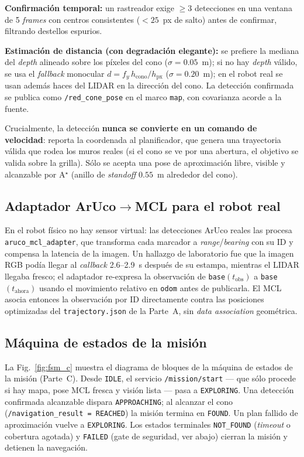 \textbf{Confirmación temporal:} un rastreador exige $\geq 3$ detecciones en una ventana de 5 \emph{frames} con centros consistentes ($<25$~px de salto) antes de confirmar, filtrando destellos espurios.

\textbf{Estimación de distancia (con degradación elegante):} se prefiere la mediana del \emph{depth} alineado sobre los píxeles del cono ($\sigma=0.05$~m); si no hay \emph{depth} válido, se usa el \emph{fallback} monocular $d = f_y\,h_{\text{cono}}/h_{\text{px}}$ ($\sigma=0.20$~m); en el robot real se usan además haces del LIDAR en la dirección del cono. La detección confirmada se publica como \texttt{/red\_cone\_pose} en el marco \texttt{map}, con covarianza acorde a la fuente.

Crucialmente, la detección \textbf{nunca se convierte en un comando de velocidad}: reporta la coordenada al planificador, que genera una trayectoria válida que rodea los muros reales (si el cono se ve por una abertura, el objetivo se valida sobre la grilla). Sólo se acepta una pose de aproximación libre, visible y alcanzable por A$^\star$ (anillo de \emph{standoff} $0.55$~m alrededor del cono).

\subsection{Adaptador ArUco$\rightarrow$MCL para el robot real}
En el robot físico no hay sensor virtual: las detecciones ArUco reales las procesa \texttt{aruco\_mcl\_adapter}, que transforma cada marcador a \emph{range}/\emph{bearing} con su ID y compensa la latencia de la imagen. Un hallazgo de laboratorio fue que la imagen RGB podía llegar al \emph{callback} 2.6--2.9~s después de su estampa, mientras el LIDAR llegaba fresco; el adaptador re-expresa la observación de \texttt{base}$(t_{\text{obs}})$ a \texttt{base}$(t_{\text{ahora}})$ usando el movimiento relativo en \texttt{odom} antes de publicarla. El MCL asocia entonces la observación por ID directamente contra las posiciones optimizadas del \texttt{trajectory.json} de la Parte~A, sin \emph{data association} geométrica.

\subsection{Máquina de estados de la misión}
La Fig.~\ref{fig:fsm_c} muestra el diagrama de bloques de la máquina de estados de la misión (Parte~C). Desde \texttt{IDLE}, el servicio \texttt{/mission/start} --- que sólo procede si hay mapa, pose MCL fresca y visión lista --- pasa a \texttt{EXPLORING}. Una detección confirmada alcanzable dispara \texttt{APPROACHING}; al alcanzar el cono (\texttt{/navigation\_result = REACHED}) la misión termina en \texttt{FOUND}. Un plan fallido de aproximación vuelve a \texttt{EXPLORING}. Los estados terminales \texttt{NOT\_FOUND} (\emph{timeout} o cobertura agotada) y \texttt{FAILED} (gate de seguridad, ver abajo) cierran la misión y detienen la navegación.

